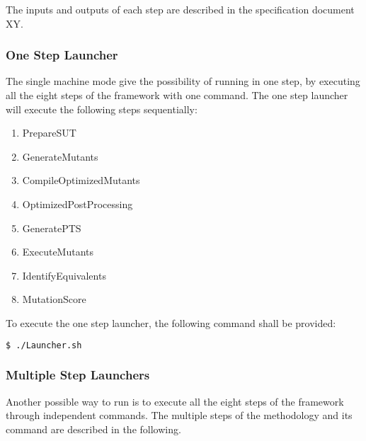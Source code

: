 The inputs and outputs of each step are described in the specification document XY.

\subsubsection{One Step Launcher}

The single machine mode give the possibility of running \MASS in one step, by executing all the eight steps of the framework with one command. The one step launcher will execute the following steps sequentially:

\begin{enumerate}
	\item PrepareSUT
	\item GenerateMutants
	\item CompileOptimizedMutants
	\item OptimizedPostProcessing
	\item GeneratePTS
	\item ExecuteMutants
	\item IdentifyEquivalents
	\item MutationScore
\end{enumerate}

To execute the one step launcher, the following command shall be provided:

\begin{lstlisting}[language=bash]
  $ ./Launcher.sh
\end{lstlisting}

\subsubsection{Multiple Step Launchers}

Another possible way to run \MASS is to execute all the eight steps of the framework through independent commands. 
The multiple steps of the methodology and its command are described in the following.

